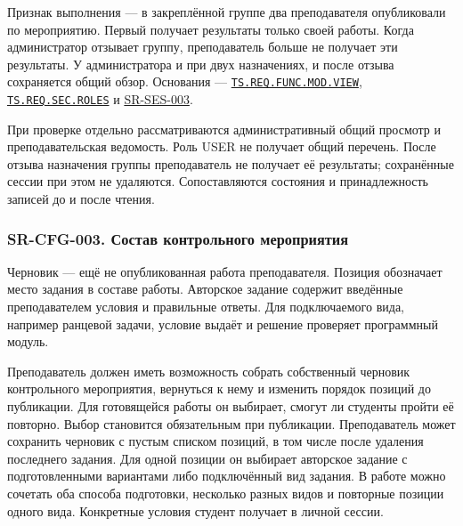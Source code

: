 \documentclass[12pt,a4paper]{article}
\begin{document}
Признак выполнения --- в закреплённой группе два преподавателя опубликовали по мероприятию. Первый получает результаты только своей работы. Когда администратор отзывает группу, преподаватель больше не получает эти результаты. У администратора и при двух назначениях, и после отзыва сохраняется общий обзор. Основания --- {\href{../02\_Техническое\_задание/DOC-02\_Техническое\_задание.pdf\#ts-req-func-mod-view}{\texttt{TS.\allowbreak{}REQ.\allowbreak{}FUNC.\allowbreak{}MOD.\allowbreak{}VIEW}}}, {\href{../02\_Техническое\_задание/DOC-02\_Техническое\_задание.pdf\#ts-req-sec-roles}{\texttt{TS.\allowbreak{}REQ.\allowbreak{}SEC.\allowbreak{}ROLES}}} и {\hyperlink{sr-ses-003}{SR-SES-003}}.

При проверке отдельно рассматриваются административный общий просмотр и преподавательская ведомость. Роль USER не получает общий перечень. После отзыва назначения группы преподаватель не получает её результаты; сохранённые сессии при этом не удаляются. Сопоставляются состояния и принадлежность записей до и после чтения.

\subsubsection{SR-CFG-003. Состав контрольного мероприятия}\label{sr-cfg-003-ux441ux43eux441ux442ux430ux432-ux43aux43eux43dux442ux440ux43eux43bux44cux43dux43eux433ux43e-ux43cux435ux440ux43eux43fux440ux438ux44fux442ux438ux44f}

\hypertarget{sr-cfg-003-состав-контрольного-мероприятия}{}

\hypertarget{sr-cfg-003}{}

Черновик --- ещё не опубликованная работа преподавателя. Позиция обозначает место задания в составе работы. Авторское задание содержит введённые преподавателем условия и правильные ответы. Для подключаемого вида, например ранцевой задачи, условие выдаёт и решение проверяет программный модуль.

Преподаватель должен иметь возможность собрать собственный черновик контрольного мероприятия, вернуться к нему и изменить порядок позиций до публикации. Для готовящейся работы он выбирает, смогут ли студенты пройти её повторно. Выбор становится обязательным при публикации. Преподаватель может сохранить черновик с пустым списком позиций, в том числе после удаления последнего задания. Для одной позиции он выбирает авторское задание с подготовленными вариантами либо подключённый вид задания. В работе можно сочетать оба способа подготовки, несколько разных видов и повторные позиции одного вида. Конкретные условия студент получает в личной сессии.
\end{document}
